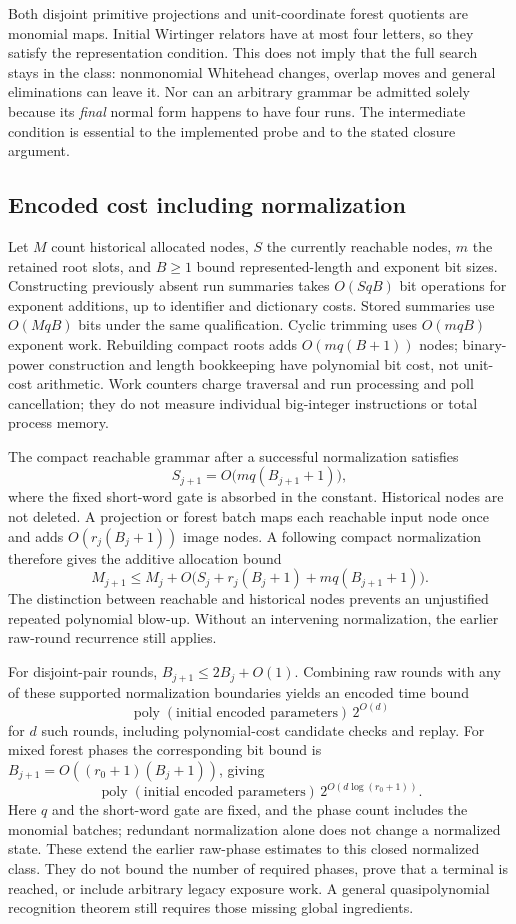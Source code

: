 Both disjoint primitive projections and unit-coordinate forest quotients
are monomial maps. Initial Wirtinger relators have at most four letters,
so they satisfy the representation condition. This does not imply that
the full search stays in the class: nonmonomial Whitehead changes, overlap
moves and general eliminations can leave it. Nor can an arbitrary grammar
be admitted solely because its \emph{final} normal form happens to have
four runs. The intermediate condition is essential to the implemented
probe and to the stated closure argument.

\subsection{Encoded cost including normalization}

Let $M$ count historical allocated nodes, $S$ the currently reachable nodes,
$m$ the retained root slots, and $B\ge1$ bound represented-length and exponent
bit sizes. Constructing previously absent run summaries takes
$O(SqB)$ bit operations for exponent additions, up to identifier and
dictionary costs. Stored summaries use $O(MqB)$ bits under the same
qualification. Cyclic trimming uses $O(mqB)$ exponent work. Rebuilding
compact roots adds $O(mq(B+1))$ nodes; binary-power construction and
length bookkeeping have polynomial bit cost, not unit-cost arithmetic.
Work counters charge traversal and run processing and poll cancellation;
they do not measure individual big-integer instructions or total process memory.

The compact reachable grammar after a successful normalization satisfies
\[
 S_{j+1}=O\bigl(mq(B_{j+1}+1)\bigr),
\]
where the fixed short-word gate is absorbed in the constant. Historical
nodes are not deleted. A projection or forest batch maps each reachable
input node once and adds $O(r_j(B_j+1))$ image nodes. A following compact
normalization therefore gives the additive allocation bound
\[
 M_{j+1}\le M_j+
 O\bigl(S_j+r_j(B_j+1)+mq(B_{j+1}+1)\bigr).
\]
The distinction between reachable and historical nodes prevents an
unjustified repeated polynomial blow-up. Without an intervening
normalization, the earlier raw-round recurrence still applies.

For disjoint-pair rounds, $B_{j+1}\le 2B_j+O(1)$. Combining raw rounds
with any of these supported normalization boundaries yields an encoded
time bound
\[
 \operatorname{poly}(\text{initial encoded parameters})\,2^{O(d)}
\]
for $d$ such rounds, including polynomial-cost candidate checks and replay.
For mixed forest phases the corresponding bit bound is
$B_{j+1}=O((r_0+1)(B_j+1))$, giving
\[
 \operatorname{poly}(\text{initial encoded parameters})\,
       2^{O(d\log(r_0+1))}.
\]
Here $q$ and the short-word gate are fixed, and the phase count includes
the monomial batches; redundant normalization alone does not change a
normalized state. These extend the earlier raw-phase estimates to this
closed normalized class. They do not bound the number of required phases,
prove that a terminal is reached, or include arbitrary legacy exposure
work. A general quasipolynomial recognition theorem still requires those
missing global ingredients.

